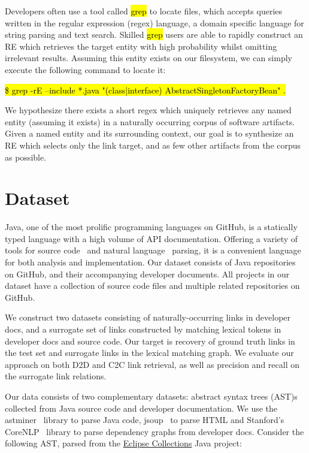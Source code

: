 \documentclass{article}
\newcommand*{\tinline}[1]{{\sethlcolor{slightgray}\ttfamily\footnotesize\relax\hl{#1}}}
\begin{document}
Developers often use a tool called \tinline{grep} to locate files, which accepts queries written in the regular expression (regex) language, a domain specific language for string parsing and text search. Skilled \tinline{grep} users are able to rapidly construct an RE which retrieves the target entity with high probability whilst omitting irrelevant results. Assuming this entity exists on our filesystem, we can simply execute the following command to locate it:

\centerline{\tinline{\$ grep -rE --include *.java "(class|interface) AbstractSingletonFactoryBean" .}}

We hypothesize there exists a short regex which uniquely retrieves any named entity (assuming it exists) in a naturally occurring corpus of software artifacts. Given a named entity and its surrounding context, our goal is to synthesize an RE which selects only the link target, and as few other artifacts from the corpus as possible.

\section{Dataset}

Java, one of the most prolific programming languages on GitHub, is a statically typed language with a high volume of API documentation. Offering a variety of tools for source code~\citep{parr2013definitive, hosseini2013javaparser, kovalenko2019pathminer} and natural language~\citep{manning2014stanford, grella2018non} parsing, it is a convenient language for both analysis and implementation. Our dataset consists of Java repositories on GitHub, and their accompanying developer documents. All projects in our dataset have a collection of source code files and multiple related repositories on GitHub.

We construct two datasets consisting of naturally-occurring links in developer docs, and a surrogate set of links constructed by matching lexical tokens in developer docs and source code. Our target is recovery of ground truth links in the test set and surrogate links in the lexical matching graph. We evaluate our approach on both D2D and C2C link retrieval, as well as precision and recall on the surrogate link relations.

Our data consists of two complementary datasets: abstract syntax trees (AST)s collected from Java source code and developer documentation. We use the astminer~\citep{kovalenko2019pathminer} library to parse Java code, jsoup~\citep{hedley2009jsoup} to parse HTML and Stanford's CoreNLP~\citep{manning2014stanford} library to parse dependency graphs from developer docs. Consider the following AST, parsed from the \href{https://www.eclipse.org/collections/}{Eclipse Collections} Java project:
\end{document}
